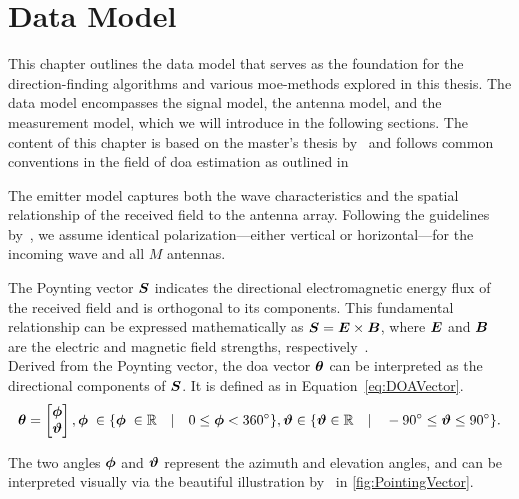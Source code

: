 \chapter{Data Model}
\label{chap:DataModel}
This chapter outlines the data model that serves as the foundation for the direction-finding algorithms and various
\gls{moe}-methods explored in this thesis. The data model encompasses the signal model, the antenna model, and the
measurement model, which we will introduce in the following sections. The content of this chapter is based on the
master's thesis by~\cite{meyer} and follows common conventions in the field of \gls{doa} estimation as outlined in~\cite{}



\label{sec:EmitterModel}

The emitter model captures both the wave characteristics and the spatial relationship of the received field to the
antenna array. Following the guidelines by~\cite[ch2.2]{meyer}, we assume identical polarization—either vertical or
horizontal—for the incoming wave and all \( M \) antennas.

The Poynting vector \( \boldsymbol{S} \) indicates the directional electromagnetic energy flux of the received field and is
orthogonal to its components. This fundamental relationship can be expressed mathematically as
\( \boldsymbol{S} = \boldsymbol{E} \times \boldsymbol{B} \), where \( \boldsymbol{E} \) and \( \boldsymbol{B} \)
are the electric and magnetic field strengths, respectively~\cite[ch2.1]{demmel}.
\\
Derived from the Poynting vector, the \gls{doa} vector \( \boldsymbol{\theta} \) can be interpreted as the
directional components of \( \boldsymbol{S} \). It is defined as in Equation~\eqref{eq:DOAVector}.
\begin{equation}
    \boldsymbol{\theta}  =
    \begin{bmatrix}
        \boldsymbol{\phi} \\
        \boldsymbol{\vartheta}
    \end{bmatrix}, \boldsymbol{\phi}\;\in \{\boldsymbol{\phi}\;\in \mathbb{R} \quad|\quad 0 \le \boldsymbol{\phi} < 360^\circ\},
    \boldsymbol{\vartheta} \in \{\boldsymbol{\vartheta} \in \mathbb{R} \quad|\quad -90^\circ \le \boldsymbol{\vartheta} \le 90^\circ  \}.
    \label{eq:DOAVector}
\end{equation}

The two angles \( \boldsymbol{\phi} \) and \( \boldsymbol{\vartheta} \) represent the azimuth and elevation angles, and can be
interpreted visually via the beautiful illustration by~\cite{meyer} in \autoref{fig:PointingVector}.

